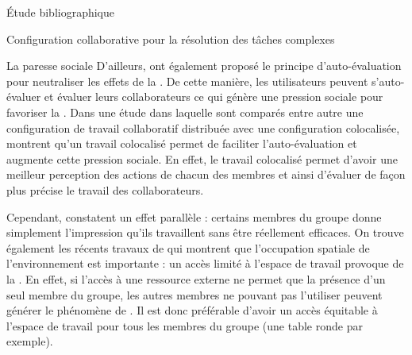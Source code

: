 \documentclass[myfrancais,ngerman,english,french]{mythesis}
\begin{document}
\begin{mychapter}{Étude bibliographique}
\begin{mysection}{Configuration collaborative pour la résolution des tâches complexes}
\begin{mysubsection}{La paresse sociale}
				D'ailleurs,  ont également proposé le principe d'auto-évaluation pour neutraliser les effets de la .
				De cette manière, les utilisateurs peuvent s'auto-évaluer et évaluer leurs collaborateurs ce qui génère une pression sociale pour favoriser la  .
				Dans une étude dans laquelle sont comparés entre autre une configuration de travail collaboratif distribuée avec une configuration colocalisée,  montrent qu'un travail colocalisé permet de faciliter l'auto-évaluation et augmente cette pression sociale.
				En effet, le travail colocalisé permet d'avoir une meilleur perception des actions de chacun des membres et ainsi d'évaluer de façon plus précise le travail des collaborateurs.

				Cependant,  constatent un effet parallèle : certains membres du groupe donne simplement l'impression qu'ils travaillent sans être réellement efficaces.
				On trouve également les récents travaux de  qui montrent que l'occupation spatiale de l'environnement est importante : un accès limité à l'espace de travail provoque de la .
				En effet, si l'accès à une ressource externe ne permet que la présence d'un seul membre du groupe, les autres membres ne pouvant pas l'utiliser peuvent générer le phénomène de .
				Il est donc préférable d'avoir un accès équitable à l'espace de travail pour tous les membres du groupe (une table ronde par exemple).


\end{mysubsection}
\end{mysection}
\end{mychapter}
\end{document}

